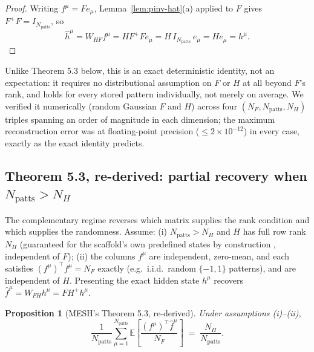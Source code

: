 \documentclass[11pt]{article}
\newtheorem{proposition}{Proposition}
\begin{document}
\begin{proof}
Writing $f^\mu=Fe_\mu$, Lemma~\ref{lem:pinv-hat}(a) applied to $F$ gives $F^+F=I_{N_{\mathrm{patts}}}$,
so
\[
\hat h^\mu = W_{HF}f^\mu = HF^+Fe_\mu = H\,I_{N_{\mathrm{patts}}}\,e_\mu = He_\mu = h^\mu.
\]
\end{proof}

Unlike Theorem 5.3 below, this is an exact deterministic identity, not an expectation: it requires
no distributional assumption on $F$ or $H$ at all beyond $F$'s rank, and holds for every stored
pattern individually, not merely on average. We verified it numerically (random Gaussian $F$ and
$H$) across four $(N_F,N_{\mathrm{patts}},N_H)$ triples spanning an order of magnitude in each
dimension; the maximum reconstruction error was at floating-point precision
($\le 2\times10^{-12}$) in every case, exactly as the exact identity predicts.

\subsection{Theorem 5.3, re-derived: partial recovery when $N_{\mathrm{patts}}>N_H$}

The complementary regime reverses which matrix supplies the rank condition and which supplies the
randomness. Assume: (i) $N_{\mathrm{patts}}>N_H$ and $H$ has full row rank $N_H$ (guaranteed for
the scaffold's own predefined states by construction \cite{sharma2022}, independent of $F$); (ii)
the columns $f^\mu$ are independent, zero-mean, and each satisfies $(f^\mu)^\top f^\mu=N_F$
exactly (e.g.\ i.i.d.\ random $\{-1,1\}$ patterns), and are independent of $H$. Presenting the
exact hidden state $h^\mu$ recovers $\hat f^\mu = W_{FH}h^\mu = FH^+h^\mu$.

\begin{proposition}[MESH's Theorem 5.3, re-derived]
\label{prop:mesh-rederived}
Under assumptions (i)--(ii),
\[
\frac{1}{N_{\mathrm{patts}}}\sum_{\mu=1}^{N_{\mathrm{patts}}}
\mathbb{E}\!\left[\frac{(f^\mu)^\top \hat f^\mu}{N_F}\right] \;=\; \frac{N_H}{N_{\mathrm{patts}}}.
\]
\end{proposition}
\end{document}
